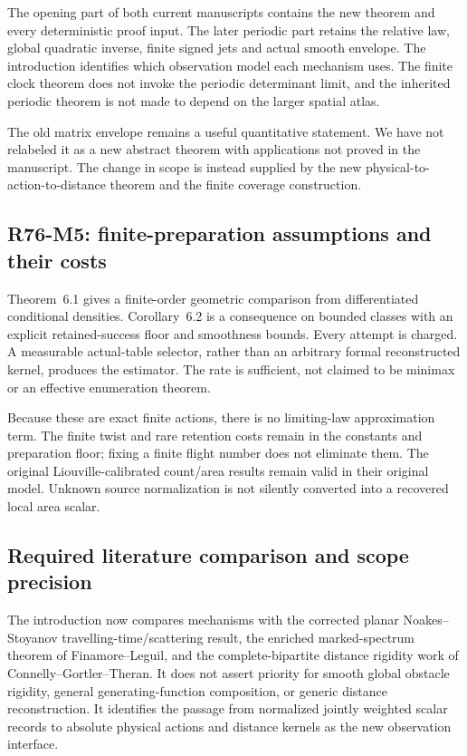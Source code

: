 \documentclass[
  11pt,
]{article}
\begin{document}
The opening part of both current manuscripts contains the new theorem
and every deterministic proof input. The later periodic part retains the
relative law, global quadratic inverse, finite signed jets and actual
smooth envelope. The introduction identifies which observation model
each mechanism uses. The finite clock theorem does not invoke the
periodic determinant limit, and the inherited periodic theorem is not
made to depend on the larger spatial atlas.

The old matrix envelope remains a useful quantitative statement. We have
not relabeled it as a new abstract theorem with applications not proved
in the manuscript. The change in scope is instead supplied by the new
physical-to-action-to-distance theorem and the finite coverage
construction.

\subsection{R76-M5: finite-preparation assumptions and their
costs}\label{r76-m5-finite-preparation-assumptions-and-their-costs}

Theorem~6.1 gives a finite-order geometric comparison
from differentiated conditional densities. Corollary~6.2 is
a consequence on bounded classes with an explicit retained-success floor
and smoothness bounds. Every attempt is charged. A measurable
actual-table selector, rather than an arbitrary formal reconstructed
kernel, produces the estimator. The rate is sufficient, not claimed to
be minimax or an effective enumeration theorem.

Because these are exact finite actions, there is no limiting-law
approximation term. The finite twist and rare retention costs remain in
the constants and preparation floor; fixing a finite flight number does
not eliminate them. The original Liouville-calibrated count/area results
remain valid in their original model. Unknown source normalization is
not silently converted into a recovered local area scalar.

\subsection{Required literature comparison and scope
precision}\label{required-literature-comparison-and-scope-precision}

The introduction now compares mechanisms with the corrected planar
Noakes--Stoyanov travelling-time/scattering result, the enriched
marked-spectrum theorem of Finamore--Leguil, and the complete-bipartite
distance rigidity work of Connelly--Gortler--Theran. It does not assert
priority for smooth global obstacle rigidity, general
generating-function composition, or generic distance reconstruction. It
identifies the passage from normalized jointly weighted scalar records
to absolute physical actions and distance kernels as the new observation
interface.
\end{document}
